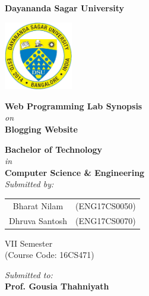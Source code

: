 \documentclass[a4paper,14pt]{extarticle}
\date{}
\begin{document}
\begin{titlepage}
    \begin{center}
        
        \Large
        \textbf{Dayananda Sagar University \\}
        
        \vspace{1cm}
        \includegraphics[width=3cm]{dsu logo cropped.jpg}
        
        \vspace{1cm}
        \Large
        \textbf{Web Programming Lab Synopsis\\}
        \large
        \textit{on \\}
        \Large
        \textbf{Blogging Website \\}
        \vfill
        
        \textbf{Bachelor of Technology \\}
        \textit{in \\}
        \textbf{Computer Science \& Engineering \\}
        \vspace{1cm}
        \textit{Submitted by: \\}
        \vspace{0.5cm}
        \begin{tabular}{c c}
            Bharat Nilam & (ENG17CS0050) \\
            Dhruva Santosh & (ENG17CS0070)
        \end{tabular}
        \vspace{1cm}
        
        \large
        VII Semester \\
        (Course Code: 16CS471)
       \vfill
        
        \textit{Submitted to: \\}
        \textbf{Prof. Gousia Thahniyath}
        
    \end{center}
\end{titlepage}

\pagebreak

\tableofcontents
\end{document}
